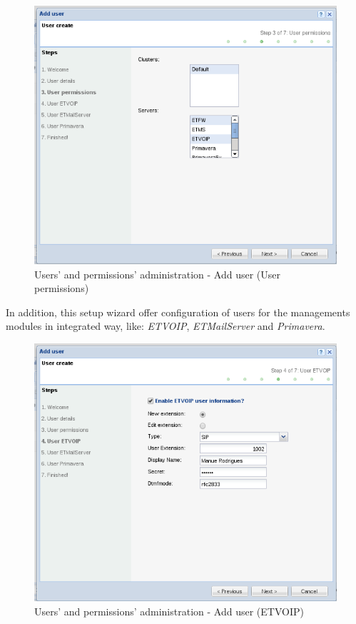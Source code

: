 {\begin{figure}[H]
        \begin{center}
        \includegraphics[scale=0.4]{screenshots/users/etva/create_user_wiz_03.png}
        \caption{Users' and permissions' administration - Add user (User permissions)}
        \label{fig:create_user_wiz_03}
        \end{center}
\end{figure}

In addition, this setup wizard offer configuration of users for the managements modules in integrated way, like: \textit{ETVOIP}, \textit{ETMailServer} and \textit{Primavera}.

\begin{figure}[H]
        \begin{center}
        \includegraphics[scale=0.4]{screenshots/users/etva/create_user_wiz_04.png}
        \caption{Users' and permissions' administration - Add user (ETVOIP)}
        \label{fig:create_user_wiz_04}
        \end{center}
\end{figure}

}
